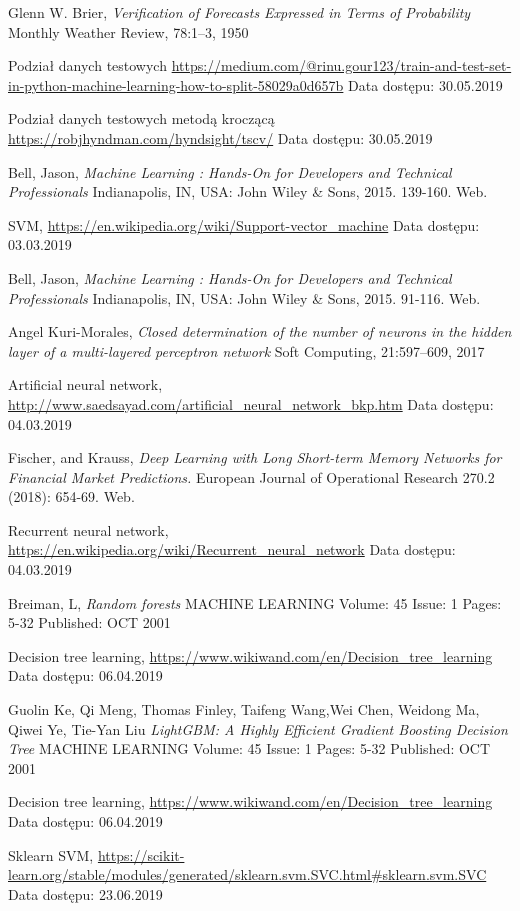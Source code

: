 \documentclass[a4paper, twoside, 11pt, openright]{article}
\begin{document}
\begin{thebibliography}{9}
	Glenn W. Brier, 
  \textit{Verification of Forecasts Expressed in Terms of Probability}
  Monthly Weather Review, 78:1–3, 1950

 Podział danych testowych \url{https://medium.com/@rinu.gour123/train-and-test-set-in-python-machine-learning-how-to-split-58029a0d657b}
 Data dostępu: 30.05.2019
 
 
 Podział danych testowych metodą kroczącą \url{https://robjhyndman.com/hyndsight/tscv/}
 Data dostępu: 30.05.2019
 
	Bell, Jason, \textit{Machine Learning : Hands-On for Developers and Technical Professionals}  Indianapolis, IN, USA: John Wiley \& Sons, 2015. 139-160. Web.
	
	SVM, \url{https://en.wikipedia.org/wiki/Support-vector_machine} 
	Data dostępu: 03.03.2019

	Bell, Jason, \textit{Machine Learning : Hands-On for Developers and Technical Professionals}  Indianapolis, IN, USA: John Wiley \& Sons, 2015. 91-116. Web.


	Angel Kuri-Morales, 
  \textit{Closed determination of the number of neurons in the hidden layer of a multi-layered perceptron network}
  Soft Computing, 21:597–609, 2017

	Artificial neural network, \url{http://www.saedsayad.com/artificial_neural_network_bkp.htm} 
	Data dostępu: 04.03.2019

	Fischer, and Krauss, 
  \textit{Deep Learning with Long Short-term Memory Networks for Financial Market Predictions.}
  European Journal of Operational Research 270.2 (2018): 654-69. Web.

	Recurrent neural network, \url{https://en.wikipedia.org/wiki/Recurrent_neural_network} 
	Data dostępu: 04.03.2019

	Breiman, L, 
  \textit{Random forests}
	MACHINE LEARNING  Volume: 45   Issue: 1   Pages: 5-32   Published: OCT 2001


	Decision tree learning, \url{https://www.wikiwand.com/en/Decision_tree_learning} 
	Data dostępu: 06.04.2019


Guolin Ke, Qi Meng, Thomas Finley, Taifeng Wang,Wei Chen, Weidong Ma, Qiwei Ye, Tie-Yan Liu
  \textit{LightGBM: A Highly Efficient Gradient Boosting Decision Tree}
	MACHINE LEARNING  Volume: 45   Issue: 1   Pages: 5-32   Published: OCT 2001

	Decision tree learning, \url{https://www.wikiwand.com/en/Decision_tree_learning} 
	Data dostępu: 06.04.2019

	Sklearn SVM, \url{https://scikit-learn.org/stable/modules/generated/sklearn.svm.SVC.html#sklearn.svm.SVC}
	Data dostępu: 23.06.2019


\end{thebibliography}
\end{document}
